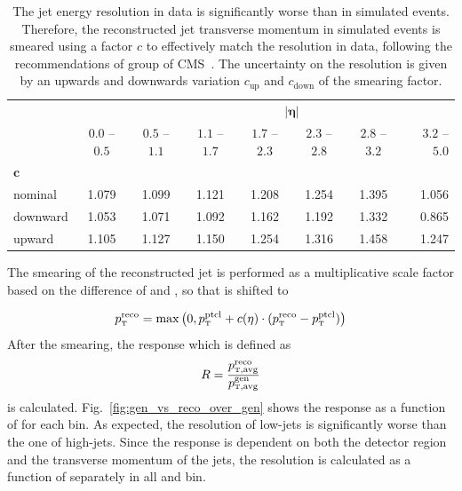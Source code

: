 \begin{table}[htbp]
\setlength\tabcolsep{4.5pt} 
    \centering
    \caption[Jet energy resolution scale factors]{
             The jet energy resolution in data is significantly worse than in
             simulated events. Therefore, the reconstructed jet transverse
             momentum in simulated events is smeared using a factor $c$ to
             effectively match the resolution in data, following the
             recommendations of \JetMET group of CMS~\cite{jetmet:resolution}.
             The uncertainty on the resolution is given by an upwards and
             downwards variation $c_\mathrm{up}$ and
             $c_\mathrm{down}$ of the smearing factor.}
    \label{tab:res_smearing}

    \begin{tabular}{lccccccr}
    \toprule
                        &                & \multicolumn{6}{c}{$\bm{|\eta|}$}\\\cmidrule{2-8}
                        & $0.0$ -- $0.5$ & $0.5$ -- $1.1$                                    & $1.1$ -- $1.7$   & $1.7$ --
               $2.3$    & $2.3$ -- $2.8$ & $2.8$ -- $3.2$                                    & $3.2$ -- $5.0$\\
               $\bm{c}$ &                &                                                   &                  &          &       &       & \\\cmidrule{1-1}
    nominal             & 1.079          & 1.099                                             & 1.121            & 1.208    & 1.254 & 1.395 & 1.056\\
    downward            & 1.053          & 1.071                                             & 1.092            & 1.162    & 1.192 & 1.332 & 0.865\\
    upward              & 1.105          & 1.127                                             & 1.150            & 1.254    & 1.316 & 1.458 & 1.247\\
    \bottomrule
    \end{tabular}
\end{table}

The smearing of the reconstructed jet \pt is performed as a multiplicative scale
factor based on the difference of \ptreco and \ptgen, so that \ptreco is shifted
to

\begin{equation}
\ptreco = \max \left( 0, \ptgen + c(\eta) \cdot (\ptreco - \ptgen) \right)
\end{equation}
%
After the smearing, the response which is defined as
%
\begin{equation}
    R = \frac{\ptavg^{\text{reco}}}{\ptavg^{\text{gen}}}
\end{equation}
%
is calculated. Fig.~\ref{fig:gen_vs_reco_over_gen} shows the response as a
function of \ptgen for each bin. As expected, the resolution of low-\pt jets is
significantly worse than the one of high-\pt jets. Since the response is dependent
on both the detector region and the transverse momentum of the jets, the resolution
is calculated as a function of \ptavggen separately in all \ystar and \yboost
bin. 

